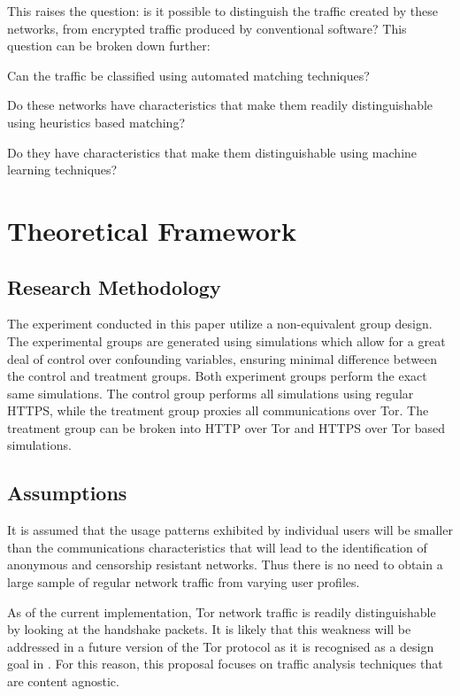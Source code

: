 \documentclass{ecuthesis}
\begin{document}
This raises the question: is it possible to distinguish the traffic created by
these networks, from encrypted traffic produced by conventional software? This
question can be broken down further:

\begin{enumerate*}
  \item Can the traffic be classified using automated matching techniques?
  \item Do these networks have characteristics that make them readily
    distinguishable using heuristics based matching?
  \item Do they have characteristics that make them distinguishable using
    machine learning techniques?
\end{enumerate*}

\chapter{Theoretical Framework}

\section{Research Methodology}

The experiment conducted in this paper utilize a non-equivalent group design.
The experimental groups are generated using simulations which allow for a great
deal of control over confounding variables, ensuring minimal difference between
the control and treatment groups. Both experiment groups perform the exact same
simulations. The control group performs all simulations using regular HTTPS,
while the treatment group proxies all communications over Tor. The treatment
group can be broken into HTTP over Tor and HTTPS over Tor based simulations.

\section{Assumptions}

It is assumed that the usage patterns exhibited by individual users will be
smaller than the communications characteristics that will lead to the
identification of anonymous and censorship resistant networks. Thus there is no
need to obtain a large sample of regular network traffic from varying user
profiles.

As of the current implementation, Tor network traffic is readily
distinguishable by looking at the handshake packets. It is likely that this
weakness will be addressed in a future version of the Tor protocol as it is
recognised as a design goal in \textcite{Dingledine:2008p1542}. For this
reason, this proposal focuses on traffic analysis techniques that are content
agnostic.
\end{document}
